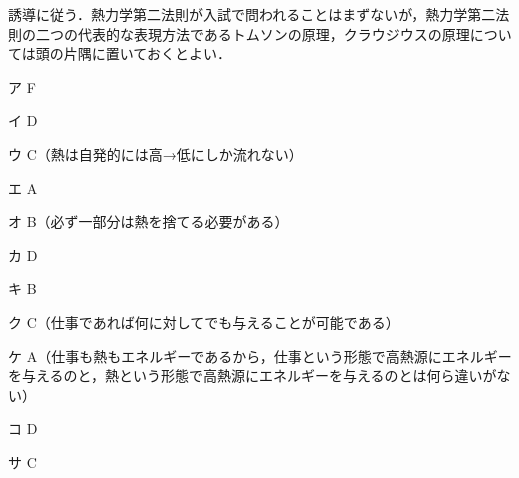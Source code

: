 \begin{multicols}{2}
\par\nopagebreak
\begin{sisin}
誘導に従う．熱力学第二法則が入試で問われることはまずないが，熱力学第二法則の二つの代表的な表現方法であるトムソンの原理，クラウジウスの原理については頭の片隅に置いておくとよい．
\end{sisin}
\par\nopagebreak
\begin{list}{}{%
  \setlength{\leftmargin}{3zw}\setlength{\labelwidth}{1.5zw}%
  \setlength{\labelsep}{1zw}\setlength{\itemsep}{0pt}%
  \setlength{\parsep}{0pt}\setlength{\topsep}{2pt}\setlength{\partopsep}{0pt}}
\item[ア] F
\item[イ] D
\item[ウ] C（熱は自発的には高→低にしか流れない）
\item[エ] A
\item[オ] B（必ず一部分は熱を捨てる必要がある）
\item[カ] D
\item[キ] B
\item[ク] C（仕事であれば何に対してでも与えることが可能である）
\item[ケ] A（仕事も熱もエネルギーであるから，仕事という形態で高熱源にエネルギーを与えるのと，熱という形態で高熱源にエネルギーを与えるのとは何ら違いがない）
\item[コ] D
\item[サ] C
\end{list}

\end{multicols}

